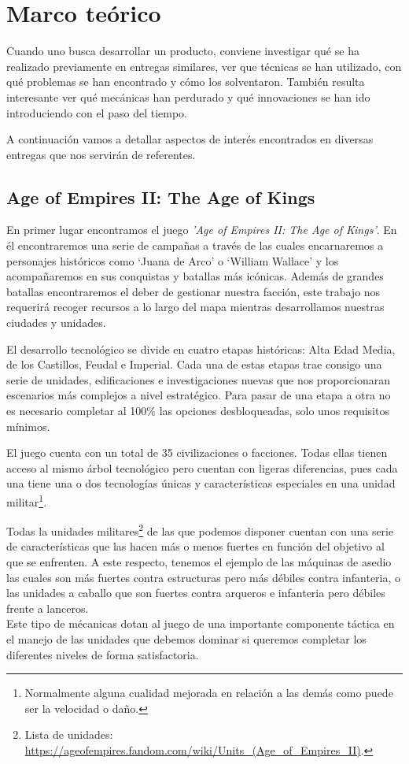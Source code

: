 \chapter{Marco teórico}
\label{Marco_teorico}

Cuando uno busca desarrollar un producto, conviene investigar qué se ha realizado
previamente en entregas similares, ver que técnicas se han utilizado, con qué problemas se han
encontrado y cómo los solventaron. También resulta interesante ver qué mecánicas han perdurado
y qué innovaciones se han ido introduciendo con el paso del tiempo.

A continuación vamos a detallar aspectos de interés encontrados en diversas entregas
que nos servirán de referentes.

\section{Age of Empires II: The Age of Kings}
En primer lugar encontramos el juego \textit{'Age of Empires II: The Age of Kings'}. En
él encontraremos una serie de campañas a través de las cuales encarnaremos a personajes
históricos como `Juana de Arco' o `William Wallace' y los acompañaremos en sus conquistas y
batallas más icónicas. Además de grandes batallas encontraremos el deber de gestionar nuestra
facción, este trabajo nos requerirá recoger recursos a lo largo del mapa mientras desarrollamos 
nuestras ciudades y unidades.

El desarrollo tecnológico se divide en cuatro etapas históricas: Alta Edad Media,
de los Castillos, Feudal e Imperial. Cada una de estas etapas trae consigo una serie de
unidades, edificaciones e investigaciones nuevas que nos proporcionaran escenarios
más complejos a nivel estratégico. Para pasar de una etapa a otra no es necesario completar
al 100\% las opciones desbloqueadas, solo unos requisitos mínimos.

El juego cuenta con un total de 35 civilizaciones o facciones. Todas ellas tienen acceso al mismo árbol
tecnológico pero cuentan con ligeras diferencias, pues cada una tiene una o dos tecnologías únicas
y características especiales en una unidad militar\footnote{Normalmente alguna cualidad mejorada en relación a las
demás como puede ser la velocidad o daño.}.

Todas la unidades militares\footnote{Lista de unidades: \url{https://ageofempires.fandom.com/wiki/Units_(Age_of_Empires_II)}.}
de las que podemos disponer cuentan con una serie de características que
las hacen más o menos fuertes en función del objetivo al que se enfrenten. A este respecto, tenemos
el ejemplo de las máquinas de asedio las cuales son más fuertes contra estructuras pero
más débiles contra infanteria, o las unidades a caballo que son fuertes contra arqueros
e infanteria pero débiles frente a lanceros. \\
Este tipo de mécanicas dotan al juego de una importante componente táctica en el manejo
de las unidades que debemos dominar si queremos completar los diferentes niveles de
forma satisfactoria.

